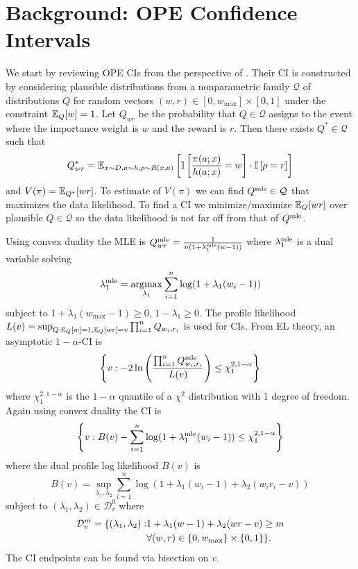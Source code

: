 \section{Background: OPE Confidence Intervals}
We start by reviewing OPE CIs from the perspective of \cite{karampatziakis2019empirical}. Their CI
is constructed by considering plausible distributions 
from a nonparametric family 
$\mathcal{Q}$ of distributions  $Q$
for random vectors $(w,r) \in [0,w_{\max}]\times [0,1]$ 
under the constraint $\mathbb{E}_Q[w]=1$. Let $Q_{wr}$ be 
the probability that $Q \in \mathcal{Q}$ assigns to the event
where the importance weight is $w$ and the
reward is $r$. Then there exists $Q^* \in \mathcal{Q}$ such that
\[
Q^*_{wr}=\mathbb{E}_{x\sim D,a\sim h,\rho\sim R(x,a)}
\left[
\mathbb{I}\left[\frac{\pi(a;x)}{h(a;x)}=w\right]\cdot
\mathbb{I}\left[\rho=r\right]
\right]
\]
and 
$
V(\pi)=\mathbb{E}_{Q^*}[wr]
$.
To estimate of $V(\pi)$ we can find 
$Q^{\textrm{mle}} \in \mathcal{Q}$ that maximizes
the data likelihood. To find a CI
we minimize/maximize $\mathbb{E}_Q[wr]$ over plausible 
$Q \in \mathcal{Q}$ so the data likelihood 
is not far off from that of $Q^{\textrm{mle}}$.

Using convex duality the MLE is
$
Q^{\textrm{mle}}_{wr} = \frac{1}{n(1+\lambda_1^{\textrm{mle}}(w-1))}
$
where $\lambda_1^{\textrm{mle}}$ is a dual variable solving
\[
\lambda_1^{\textrm{mle}} = \operatorname*{argmax}_{\lambda_1} \sum_{i=1}^n \log(1+\lambda_1(w_i-1))
\]
subject to $1+\lambda_1(w_{\max}-1)\geq 0$, $1-\lambda_1\geq 0$.
The profile likelihood
$
L(v)=\sup_{Q: \mathbb{E}_Q[w]=1, \mathbb{E}_Q[wr]=v} \prod_{i=1}^n Q_{w_i,r_i}
$
is used for CIs. From EL theory,
an asymptotic $1-\alpha$-CI is
\[
\left\{v: -2\ln\left(\frac{\prod_{i=1}^n Q^{\textrm{mle}}_{w_i,r_i}}{L(v)}\right)
\leq \chi_1^{2,1-\alpha}\right\}
\]
where $\chi_1^{2,1-\alpha}$ is the $1-\alpha$ quantile of a $\chi^2$
distribution with 1 degree of freedom.
Again using convex duality the CI is
\[
\left\{v: 
B(v)-\sum_{i=1}^n\log(1+\lambda_1^{\textrm{mle}}(w_i-1))
\leq \chi_1^{2,1-\alpha}\right\}
\]
where the dual profile log likelihood $B(v)$ is
\begin{equation}
B(v) = \sup_{\lambda_1,\lambda_2} \sum_{i=1}^n \log(1+\lambda_1(w_i-1)+\lambda_2(w_i r_i -v))    \label{eq:dual-lik}
\end{equation}
subject to $(\lambda_1,\lambda_2) \in \mathcal{D}_v^0$ where 
\begin{align}
\mathcal{D}_v^{m} =
\{(\lambda_1,\lambda_2): & 1+\lambda_1(w-1)+\lambda_2(wr-v)\geq m \label{eq:batch-domain}\notag\\
                         & \forall (w,r) \in \{0,w_{\max}\}\times \{0,1\}
\}.
\end{align}
The CI endpoints can be found via 
bisection on $v$.

